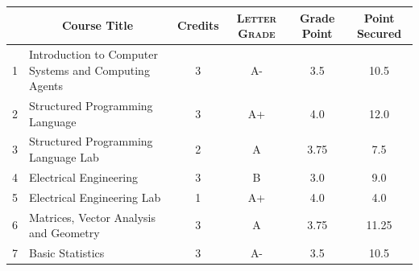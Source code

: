 \documentclass[11pt]{article}
\newcommand*{\numtwo}[1]{\pgfmathprintnumber[
                    fixed, precision=2, fixed zerofill=true]{#1}}
\begin{document}
                \begin{center}
                    \renewcommand{\arraystretch}{1.08}
                    
                \begin{tabular}{|c|l|c|>{\scshape}c|c|c|}
                \hline  \rule[-1ex]{0pt}{3.5ex} {\centering{\bf Course Code}} &  \multicolumn{1}{c|}{\textbf{Course Title}}  & {\bf Credits} & {\bf Letter Grade} & {\bf Grade Point} & {\bf Point Secured}  \\ 
                \hline   1 &  Introduction to Computer Systems and Computing Agents		 & 3 & A- & 3.5 & 10.5 \\ %
                \hline   2 &  Structured Programming Language		 & 3 & A+ & 4.0 & 12.0 \\ %
                \hline   3 &  Structured Programming Language Lab		 & 2 & A & 3.75 & 7.5 \\ %
                \hline   4 &  Electrical Engineering		 & 3 & B & 3.0 & 9.0 \\ %
                \hline   5 &  Electrical Engineering Lab		 & 1 & A+ & 4.0 & 4.0 \\ %
                \hline   6 &  Matrices, Vector Analysis and Geometry		 & 3 & A & 3.75 & 11.25 \\ %
                \hline   7 &  Basic Statistics		 & 3 & A- & 3.5 & 10.5 \\ %

\hline                %
                \end{tabular}
                \end{center}
                \renewcommand{\arraystretch}{1.03}
\end{document}
